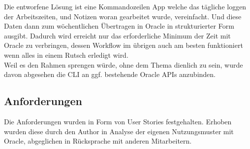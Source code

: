\documentclass[oneside,bibliography=totocnumbered,BCOR=5mm]{scrbook}
\begin{document}
Die entworfene Lösung ist eine Kommandozeilen App welche das tägliche loggen der
Arbeitszeiten, und Notizen woran gearbeitet wurde, vereinfacht. Und diese Daten
dann zum wöchentlichen Übertragen in Oracle in strukturierter Form ausgibt.
Dadurch wird erreicht nur das erforderliche Minimum der Zeit mit Oracle zu
verbringen, dessen Workflow im übrigen auch am besten funktioniert wenn alles in
einem Rutsch erledigt wird.
\\
Weil es den Rahmen sprengen würde, ohne dem Thema dienlich zu sein, wurde davon
abgesehen die CLI an ggf. bestehende Oracle APIs anzubinden.

\subsection{Anforderungen}

Die Anforderungen wurden in Form von User Stories festgehalten. Erhoben wurden
diese durch den Author in Analyse der eigenen Nutzungsmuster mit Oracle,
abgeglichen in Rücksprache mit anderen Mitarbeitern.
\end{document}
